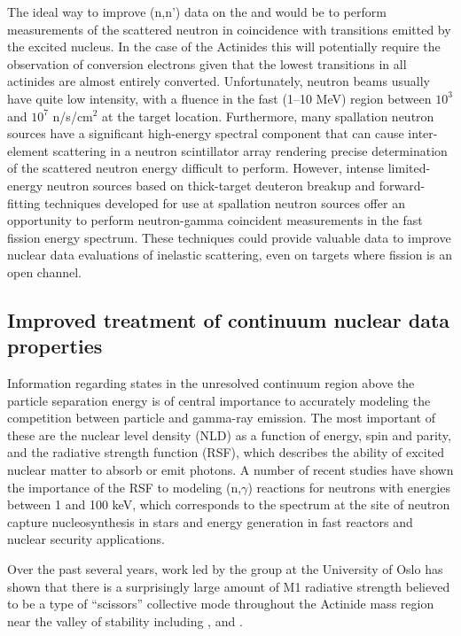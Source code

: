\documentclass[letterpaper]{ar-1col}
\begin{document}
The ideal way to improve (n,n') data on the  and  would be to perform measurements of the scattered neutron in coincidence with transitions emitted by the excited nucleus.
 In the case of the Actinides this will potentially require the observation of conversion electrons given that the lowest transitions in all actinides are almost entirely converted.
 Unfortunately, neutron beams usually have quite low intensity, with a fluence in the fast (1--10 MeV) region between $10^3$ and $10^7$ n/s/cm$^2$ at the target location.
 Furthermore, many spallation neutron sources have a significant high-energy spectral component that can cause inter-element scattering in a neutron scintillator array rendering precise determination of the scattered neutron energy difficult to  perform.
However, intense limited-energy neutron sources based on thick-target deuteron breakup \cite{Harrig2018} and forward-fitting techniques developed for use at spallation neutron sources \cite{Kee18} offer an opportunity to perform neutron-gamma coincident measurements in the fast fission energy spectrum.
 These techniques could provide valuable data to improve nuclear data evaluations of inelastic scattering, even on targets where fission is an open channel.


\subsection{Improved treatment of continuum nuclear data properties}

Information regarding states in the unresolved continuum region above the particle separation energy is of central importance to accurately modeling the competition between particle and gamma-ray emission.
 The most important of these are the nuclear level density (NLD) as a function of energy, spin and parity, and the radiative strength function (RSF), which describes the ability of excited nuclear matter to absorb or emit photons.
 A number of recent studies have shown the importance of the RSF to modeling (n,$\gamma$) reactions for neutrons with energies between 1 and 100 keV, which corresponds to the spectrum at the site of neutron capture nucleosynthesis in stars \cite{PhysRevC.82.014318, Lar15} and energy generation in fast reactors and nuclear security applications.
  

Over the past several years, work led by the group at the University of Oslo has shown that there is a surprisingly large amount of M1 radiative strength believed to be a type of \enquote{scissors} collective mode throughout the Actinide mass region near the valley of stability including ,  and  \cite{Lap16, Gut13, Gut13a, Gut14, Gut15}.
\end{document}
